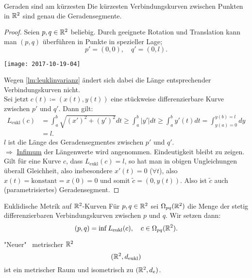 \begin{lemma}{Geraden sind am kürzesten}
  Die kürzesten Verbindungskurven zwischen Punkten in $ \mathbb{R}^2 $ sind genau die Geradensegmente. \\
  \begin{proof}
    Seien $ p, q \in \mathbb{R}^2 $ beliebig. Durch geeignete Rotation und Translation kann man $ (p,q) $ überführen in Punkte in spezieller Lage;
    \begin{equation*}
      p' = (0,0), \quad q' = (0,l)\text{.}
    \end{equation*}
    \begin{marginfigure}
      \texttt{[image: 2017-10-19-04]}
      \caption{Verschiebung von $ p $ und $ q $ auf $ p' $ und $ q' $.}
    \end{marginfigure}
    Wegen \autoref{lm:leuklinvarianz} ändert sich dabei die Länge entsprechender Verbindungskurven nicht. \\
    Sei jetzt $ c(t) \coloneqq (x(t),y(t)) $ eine stückweise differenzierbare Kurve zwischen $ p' $ und $ q' $. Dann gilt:
    \begin{align*}
      L_\text{eukl}(c) &= \int_a^b\sqrt{(x')^2+(y')^2}dt \geq \int_a^b\vert y' \vert dt \geq \int_a^by'(t)dt = \int_{y(a) = 0}^{y(b) = l} dy \\
       &= l\text{.}
    \end{align*}
    $ l $ ist die Länge des Geradensegmentes zwischen $ p' $ und $ q' $. \\
    $ \Rightarrow $ \underline{Infimum} der Längenwerte wird angenommen. Eindeutigkeit bleibt zu zeigen. \\
    Gilt für eine Kurve $ c $, dass $ L_\text{eukl}(c) = l $, so hat man in obigen Ungleichungen überall Gleichheit, also insbesondere $ x'(t) = 0 $ ($ \forall t $), also $ x(t) = \text{konstant} = x(0) = 0 $ und somit $ \widetilde{c} = (0,y(t)) $. Also ist $ \widetilde{c} $ auch (parametrisiertes) Geradensegment.
  \end{proof}
\end{lemma}

\begin{definition}{Euklidische Metrik auf $ \mathbb{R}^2 $-Kurven}
  Für $ p,q \in \mathbb{R}^2 $ sei $ \Omega_{pq}(\mathbb{R}^2) $ die Menge der stetig differenzierbaren Verbindungskurven zwischen $ p $ und $ q $. Wir setzen dann:
  \begin{equation*}
    (p,q) = \inf L_\text{eukl}(c), \quad c \in \Omega_{pq}(\mathbb{R}^2)\text{.}
  \end{equation*}
\end{definition}

\begin{theorem}{"Neuer" \ metrischer $ \mathbb{R}^2 $}
  \begin{equation*}
    (\mathbb{R}^2, d_\text{eukl})
  \end{equation*}
  ist ein metrischer Raum und isometrisch zu $ (\mathbb{R}^2, d_e) $.
\end{theorem}